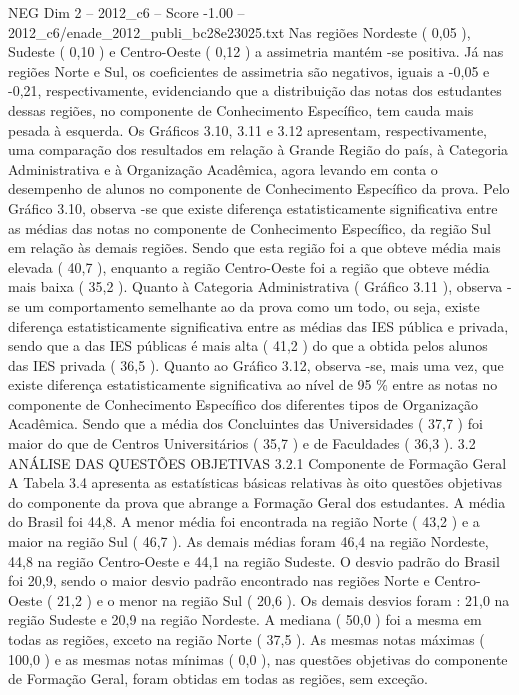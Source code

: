\begin{textsample}{NEG Dim 2 – 2012\_c6 – Score -1.00 – 2012\_c6/enade\_2012\_publi\_bc28e23025.txt}
Nas regiões Nordeste ( 0,05 ), Sudeste ( 0,10 ) e Centro-Oeste ( 0,12 ) a assimetria mantém -se positiva.
Já nas regiões Norte e Sul, os coeficientes de assimetria são negativos, iguais a -0,05 e -0,21, respectivamente, evidenciando que a distribuição das notas dos estudantes dessas regiões, no componente de Conhecimento Específico, tem cauda mais pesada à esquerda.
Os Gráficos 3.10, 3.11 e 3.12 apresentam, respectivamente, uma comparação dos resultados em relação à Grande Região do país, à Categoria Administrativa e à Organização Acadêmica, agora levando em conta o desempenho de alunos no componente de Conhecimento Específico da prova.
Pelo Gráfico 3.10, observa -se que existe diferença estatisticamente significativa entre as médias das notas no componente de Conhecimento Específico, da região Sul em relação às demais regiões.
Sendo que esta região foi a que obteve média mais elevada ( 40,7 ), enquanto a região Centro-Oeste foi a região que obteve média mais baixa ( 35,2 ).
Quanto à Categoria Administrativa ( Gráfico 3.11 ), observa -se um comportamento semelhante ao da prova como um todo, ou seja, existe diferença estatisticamente significativa entre as médias das IES pública e privada, sendo que a das IES públicas é mais alta ( 41,2 ) do que a obtida pelos alunos das IES privada ( 36,5 ).
Quanto ao Gráfico 3.12, observa -se, mais uma vez, que existe diferença estatisticamente significativa ao nível de 95 \% entre as notas no componente de Conhecimento Específico dos diferentes tipos de Organização Acadêmica.
Sendo que a média dos Concluintes das Universidades ( 37,7 ) foi maior do que de Centros Universitários ( 35,7 ) e de Faculdades ( 36,3 ). 3.2 ANÁLISE DAS QUESTÕES OBJETIVAS 3.2.1 Componente de Formação Geral A Tabela 3.4 apresenta as estatísticas básicas relativas às oito questões objetivas do componente da prova que abrange a Formação Geral dos estudantes.
A média do Brasil foi 44,8.
A menor média foi encontrada na região Norte ( 43,2 ) e a maior na região Sul ( 46,7 ).
As demais médias foram 46,4 na região Nordeste, 44,8 na região Centro-Oeste e 44,1 na região Sudeste.
O desvio padrão do Brasil foi 20,9, sendo o maior desvio padrão encontrado nas regiões Norte e Centro-Oeste ( 21,2 ) e o menor na região Sul ( 20,6 ).
Os demais desvios foram : 21,0 na região Sudeste e 20,9 na região Nordeste.
A mediana ( 50,0 ) foi a mesma em todas as regiões, exceto na região Norte ( 37,5 ).
As mesmas notas máximas ( 100,0 ) e as mesmas notas mínimas ( 0,0 ), nas questões objetivas do componente de Formação Geral, foram obtidas em todas as regiões, sem exceção.

\end{textsample}
